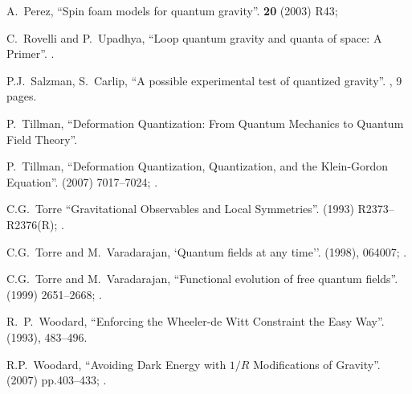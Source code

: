 \begin{thebibliography}{99}
A.~Perez,
``Spin foam models for quantum gravity''.
 \textbf{20} (2003) R43;
\\
{\tt{}}

C.~Rovelli and P.~Upadhya,
``Loop quantum gravity and quanta of space: A Primer''.
.

 P.J.~Salzman, S.~Carlip,
``A possible experimental test of quantized gravity''. , 9 pages.

 P.~Tillman, ``Deformation Quantization: From Quantum Mechanics to
Quantum Field Theory''. 

 P.~Tillman, ``Deformation Quantization, Quantization, and the
Klein-Gordon Equation''.
  (2007) 7017--7024; .\\
{\tt{}}

C.G.~Torre
``Gravitational Observables and Local Symmetries''.
  (1993) R2373--R2376(R); .\newline
{\tt{}}

C.G.~Torre and M.~Varadarajan,
`Quantum fields at any time''.
  (1998), 064007; .\newline
{\tt{}}

C.G.~Torre and M.~Varadarajan,
``Functional evolution of free quantum fields''.
  (1999) 2651--2668; .\newline
{\tt{}}

R.~P.~Woodard,
``Enforcing the Wheeler-de Witt Constraint the Easy Way''.
  (1993), 483--496.\\
{\tt{}}

 R.P.~Woodard,
  ``Avoiding Dark Energy with $1/R$ Modifications of Gravity''.
    (2007) pp.403--433; .\\
{\tt{}}


\end{thebibliography}
